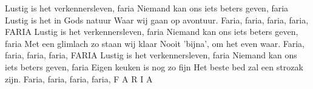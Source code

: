 
\beginverse
Lustig is het verkennersleven, faria
Niemand kan ons iets beters geven, faria
Lustig is het in Gods natuur
Waar wij gaan op avontuur.
Faria, faria, faria, faria, FARIA
\endverse
\beginverse
Lustig is het verkennersleven, faria
Niemand kan ons iets beters geven, faria
Met een glimlach zo staan wij klaar
Nooit 'bijna', om het even waar.
Faria, faria, faria, faria, FARIA
\endverse
\beginverse
Lustig is het verkennersleven, faria
Niemand kan ons iets beters geven, faria
Eigen keuken is nog zo fijn
Het beste bed zal een strozak zijn.
Faria, faria, faria, faria, F A R I A
\endverse
\endsong